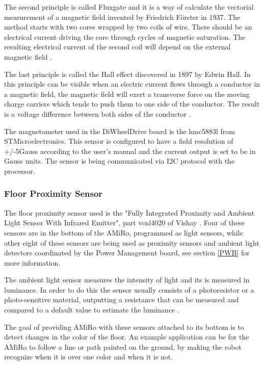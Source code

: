 \documentclass[12pt]{report}%
\begin{document}
The second principle is called Fluxgate and it is a way of calculate the vectorial measurement of a magnetic field invented by Friedrich Förster in 1937. The method starts with two cores wrapped by two coils of wire. There should be an electrical current driving the core through cycles of magnetic saturation. The resulting electrical current of the second coil will depend on the external magnetic field \cite{AMiRo_ppt_v1}.

The last principle is called the Hall effect discovered in 1897 by Edwin Hall. In this principle can be visible when an electric current flows through a conductor in a magnetic field, the magnetic field will exert a transverse force on the moving charge carriers which tends to push them to one side of the conductor. The result is a voltage difference between both sides of the conductor \cite{halleffect}.

The magnetometer used in the DiWheelDrive board is the hmc5883l from STMicroelectronics. This sensor is configured to have a field resolution of +/-5Gauss according to the user's manual \cite{magnetometerpart} and the current output is set to be in Gauss units. The sensor is being communicated via I2C protocol with the processor.

\subsubsection{Floor Proximity Sensor}
\label{sec:AMS}
The floor proximity sensor used is the "Fully Integrated Proximity and Ambient Light Sensor With Infrared Emitter", part vcnl4020 of Vishay \cite{proxsensor}. Four of these sensors are in the bottom of the AMiRo, programmed as light sensors, while other eight of these sensors are being used as proximity sensors and ambient light detectors coordinated by the Power Management board, see section \ref{PWB} for more information.

The ambient light sensor measures the intensity of light and its is measured in luminance. In order to do this the sensor usually consists of a photoresistor or a photo-sensitive material, outputting a resistance that can be measured and compared to a default value to estimate the luminance \cite{amstheory}.

The goal of providing AMiRo with these sensors attached to its bottom is to detect changes in the color of the floor. An example application can be for the AMiRo to follow a line or path painted on the ground, by making the robot recognize when it is over one color and when it is not.
\end{document}
